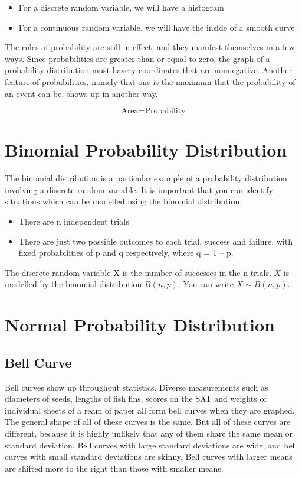 \documentclass[12pt]{article}
\begin{document}
\begin{itemize}
\item For a discrete random variable, we will have a histogram
\item For a continuous random variable, we will have the inside of a smooth curve
\end{itemize}

The rules of probability are still in effect, and they manifest themselves in a few ways. Since probabilities are greater than or equal to zero, the graph of a probability distribution must have y-coordinates that are nonnegative. Another feature of probabilities, namely that one is the maximum that the probability of an event can be, shows up in another way.

\[ \mbox{Area} = \mbox{Probability} \]



\newpage
\section{Binomial Probability Distribution}
The binomial distribution is a particular example of a probability distribution involving a discrete random variable. 
It is important that you can identify situations which can be modelled using the binomial distribution. 
\begin{itemize}
\item There are n independent trials 
\item There are just two possible outcomes to each trial, success and failure, with fixed probabilities of p and q respectively, where q = 1 – p. 
\end{itemize}

The discrete random variable X is the number of successes in the n trials. 
$X$ is modelled by the binomial distribution $B(n,p)$. You can write $X \sim B(n, p)$.




\newpage
\section{Normal Probability Distribution}

\subsection{Bell Curve}
Bell curves show up throughout statistics. Diverse measurements such as diameters of seeds, lengths of fish fins, scores on the SAT and weights of individual sheets of a ream of paper all form bell curves when they are graphed. The general shape of all of these curves is the same. But all of these curves are different, because it is highly unlikely that any of them share the same mean or standard deviation. Bell curves with large standard deviations are wide, and bell curves with small standard deviations are skinny. Bell curves with larger means are shifted more to the right than those with smaller means.
\end{document}
